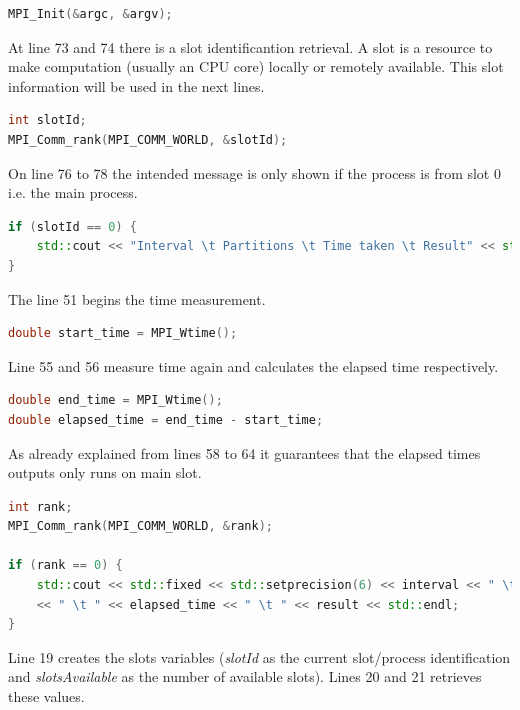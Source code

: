 		\begin{lstlisting}[language=C++]
MPI_Init(&argc, &argv);
		\end{lstlisting}


		\par At line 73 and 74 there is a slot identificantion retrieval. A slot is a resource to make computation (usually an CPU core) locally or remotely available. This slot information will be used in the next lines.
		
	\begin{lstlisting}[language=C++]
int slotId;
MPI_Comm_rank(MPI_COMM_WORLD, &slotId);
	\end{lstlisting}
	
	\par On line 76 to 78 the intended message is only shown if the process is from slot 0 i.e. the main process.
	\begin{lstlisting}[language=C++]
 if (slotId == 0) {
	std::cout << "Interval \t Partitions \t Time taken \t Result" << std::endl;
}
	\end{lstlisting}

	\par The line 51 begins the time measurement.
	
	\begin{lstlisting}[language=C++]
double start_time = MPI_Wtime();
	\end{lstlisting}

	\par Line 55 and 56 measure time again and calculates the elapsed time respectively.
	
	\begin{lstlisting}[language=C++]
double end_time = MPI_Wtime();
double elapsed_time = end_time - start_time;
	\end{lstlisting}

	\par As already explained from lines 58 to 64 it guarantees that the elapsed times outputs only runs on main slot. 

	\begin{lstlisting}[language=C++]
int rank;
MPI_Comm_rank(MPI_COMM_WORLD, &rank);

if (rank == 0) {
	std::cout << std::fixed << std::setprecision(6) << interval << " \t " << partitions
	<< " \t " << elapsed_time << " \t " << result << std::endl;
}
	\end{lstlisting}

	\par Line 19 creates the slots variables (\textit{slotId} as the current slot/process identification and \textit{slotsAvailable} as the number of available slots). Lines 20 and 21 retrieves these values.
	
